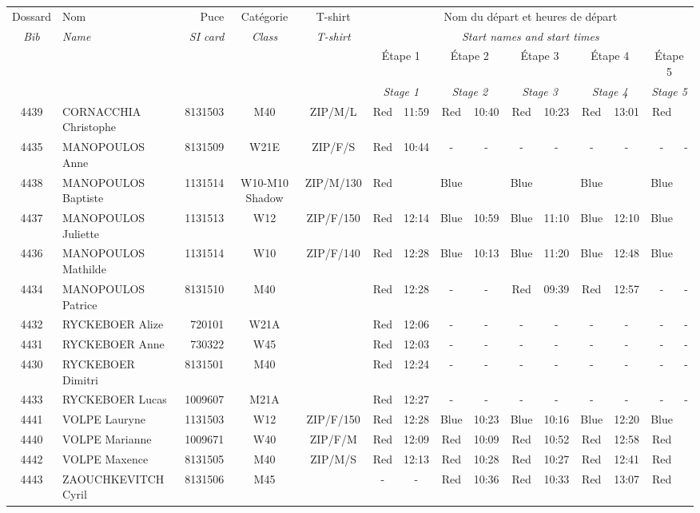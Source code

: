 \documentclass{report}
\begin{document}
  \begin{longtable}{|c|l|r|c|c|*{5}{cc|}}
    Dossard & Nom  & Puce    & Catégorie & T-shirt & \multicolumn{10}{c|}{Nom du départ et heures de départ} \\
    \itshape Bib     & \itshape Name & \itshape SI card & \itshape Class  & \itshape  T-shirt  & \multicolumn{10}{c|}{\itshape Start names and start times} \\
    \hline
    & & & & & \multicolumn{2}{c|}{Étape 1} & \multicolumn{2}{c|}{Étape 2} & \multicolumn{2}{c|}{Étape 3} & \multicolumn{2}{c|}{Étape 4} & \multicolumn{2}{c|}{Étape 5} \\
    & & & & & \multicolumn{2}{c|}{\itshape Stage 1} & \multicolumn{2}{c|}{\itshape Stage 2} & \multicolumn{2}{c|}{\itshape Stage 3} & \multicolumn{2}{c|}{\itshape Stage 4} & \multicolumn{2}{c|}{\itshape Stage 5} \\
    \hline
    4439 & CORNACCHIA Christophe & 8131503 & M40 & ZIP/M/L & Red & 11:59 & Red & 10:40 & Red & 10:23 & Red & 13:01 & Red &  \\
    4435 & MANOPOULOS Anne & 8131509 & W21E & ZIP/F/S & Red & 10:44 & - &  - & - &  - & - &  - & - &  -\\
    4438 & MANOPOULOS Baptiste & 1131514 & W10-M10 Shadow & ZIP/M/130 & Red &   & Blue &   & Blue &   & Blue &   & Blue &  \\
    4437 & MANOPOULOS Juliette & 1131513 & W12 & ZIP/F/150 & Red & 12:14 & Blue & 10:59 & Blue & 11:10 & Blue & 12:10 & Blue &  \\
    4436 & MANOPOULOS Mathilde & 1131514 & W10 & ZIP/F/140 & Red & 12:28 & Blue & 10:13 & Blue & 11:20 & Blue & 12:48 & Blue &  \\
    4434 & MANOPOULOS Patrice & 8131510 & M40 &   & Red & 12:28 & - &  - & Red & 09:39 & Red & 12:57 & - &  -\\
    4432 & RYCKEBOER Alize & 720101 & W21A &   & Red & 12:06 & - &  - & - &  - & - &  - & - &  -\\
    4431 & RYCKEBOER Anne & 730322 & W45 &   & Red & 12:03 & - &  - & - &  - & - &  - & - &  -\\
    4430 & RYCKEBOER Dimitri & 8131501 & M40 &   & Red & 12:24 & - &  - & - &  - & - &  - & - &  -\\
    4433 & RYCKEBOER Lucas & 1009607 & M21A &   & Red & 12:27 & - &  - & - &  - & - &  - & - &  -\\
    4441 & VOLPE Lauryne & 1131503 & W12 & ZIP/F/150 & Red & 12:28 & Blue & 10:23 & Blue & 10:16 & Blue & 12:20 & Blue &  \\
    4440 & VOLPE Marianne & 1009671 & W40 & ZIP/F/M & Red & 12:09 & Red & 10:09 & Red & 10:52 & Red & 12:58 & Red &  \\
    4442 & VOLPE Maxence & 8131505 & M40 & ZIP/M/S & Red & 12:13 & Red & 10:28 & Red & 10:27 & Red & 12:41 & Red &  \\
    4443 & ZAOUCHKEVITCH Cyril & 8131506 & M45 &   & - &  - & Red & 10:36 & Red & 10:33 & Red & 13:07 & Red &  \\
  \end{longtable}
\end{document}

